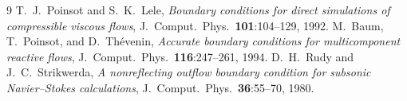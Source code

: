 \documentclass[11pt,a4paper]{article}
\begin{document}
\begin{thebibliography}{9}
 T.~J.~Poinsot and S.~K.~Lele,
  \textit{Boundary conditions for direct simulations of compressible viscous
  flows}, J.\ Comput.\ Phys.\ \textbf{101}:104--129, 1992.
 M.~Baum, T.~Poinsot, and D.~Th\'{e}venin,
  \textit{Accurate boundary conditions for multicomponent reactive flows},
  J.\ Comput.\ Phys.\ \textbf{116}:247--261, 1994.
 D.~H.~Rudy and J.~C.~Strikwerda,
  \textit{A nonreflecting outflow boundary condition for subsonic
  Navier--Stokes calculations}, J.\ Comput.\ Phys.\ \textbf{36}:55--70, 1980.
\end{thebibliography}
\end{document}
